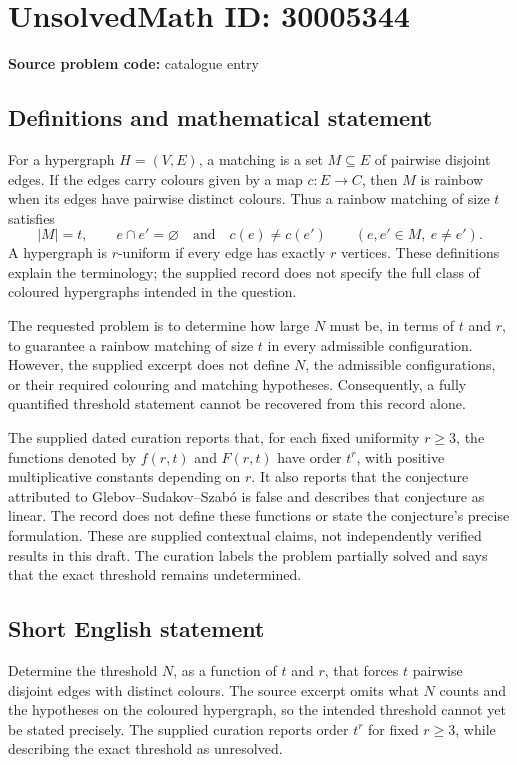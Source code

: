 \documentclass[11pt]{article}
\begin{document}
\section*{UnsolvedMath ID: 30005344}
\textbf{Source problem code:} catalogue entry
\subsection{Definitions and mathematical statement}
For a hypergraph \(H=(V,E)\), a matching is a set \(M\subseteq E\) of pairwise disjoint edges. If the edges carry colours given by a map \(c:E\to C\), then \(M\) is rainbow when its edges have pairwise distinct colours. Thus a rainbow matching of size \(t\) satisfies
\[
|M|=t,\qquad e\cap e'=\varnothing\quad\text{and}\quad c(e)\ne c(e')\qquad(e,e'\in M,\ e\ne e').
\]
A hypergraph is \(r\)-uniform if every edge has exactly \(r\) vertices. These definitions explain the terminology; the supplied record does not specify the full class of coloured hypergraphs intended in the question.

The requested problem is to determine how large \(N\) must be, in terms of \(t\) and \(r\), to guarantee a rainbow matching of size \(t\) in every admissible configuration. However, the supplied excerpt does not define \(N\), the admissible configurations, or their required colouring and matching hypotheses. Consequently, a fully quantified threshold statement cannot be recovered from this record alone.

The supplied dated curation reports that, for each fixed uniformity \(r\ge 3\), the functions denoted by \(f(r,t)\) and \(F(r,t)\) have order \(t^r\), with positive multiplicative constants depending on \(r\). It also reports that the conjecture attributed to Glebov--Sudakov--Szab\'o is false and describes that conjecture as linear. The record does not define these functions or state the conjecture's precise formulation. These are supplied contextual claims, not independently verified results in this draft. The curation labels the problem partially solved and says that the exact threshold remains undetermined.
\subsection{Short English statement}
Determine the threshold \(N\), as a function of \(t\) and \(r\), that forces \(t\) pairwise disjoint edges with distinct colours. The source excerpt omits what \(N\) counts and the hypotheses on the coloured hypergraph, so the intended threshold cannot yet be stated precisely. The supplied curation reports order \(t^r\) for fixed \(r\ge 3\), while describing the exact threshold as unresolved.
\end{document}
